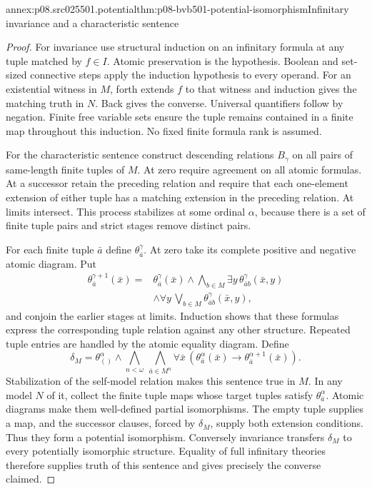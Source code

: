 \begin{annexitem}{annex:p08.src025501.potential}{thm:p08-bvb501-potential-isomorphism}{Infinitary invariance and a characteristic sentence}
\begin{proof}
For invariance use structural induction on an infinitary formula at any
tuple matched by \(f\in I\). Atomic preservation is the hypothesis.
Boolean and set-sized connective steps apply the induction hypothesis to
every operand. For an existential witness in \(M\), forth extends \(f\)
to that witness and induction gives the matching truth in \(N\). Back
gives the converse. Universal quantifiers follow by negation. Finite free
variable sets ensure the tuple remains contained in a finite map throughout
this induction. No fixed finite formula rank is assumed.

For the characteristic sentence construct descending relations \(B_\gamma\)
on all pairs of same-length finite tuples of \(M\). At zero require
agreement on all atomic formulas. At a successor retain the preceding
relation and require that each one-element extension of either tuple has
a matching extension in the preceding relation. At limits intersect.
This process stabilizes at some ordinal \(\alpha\), because there is
a set of finite tuple pairs and strict stages remove distinct pairs.

For each finite tuple \(\bar a\) define \(\theta_{\bar a}^\gamma\).
At zero take its complete positive and negative atomic diagram. Put
\[
\begin{split}
\theta_{\bar a}^{\gamma+1}(\bar x)={}&
 \theta_{\bar a}^\gamma(\bar x)
 \land\bigwedge_{b\in M}\exists y\,
       \theta_{\bar a b}^\gamma(\bar x,y)\\
 &\land\forall y\,\bigvee_{b\in M}
       \theta_{\bar a b}^\gamma(\bar x,y),
\end{split}
\]
and conjoin the earlier stages at limits. Induction shows that these
formulas express the corresponding tuple relation against any other
structure. Repeated tuple entries are handled by the atomic equality
diagram. Define
\[
\delta_M=\theta_{()}^\alpha\land
 \bigwedge_{n<\omega}\ \bigwedge_{\bar a\in M^n}
 \forall\bar x\,
 (\theta_{\bar a}^\alpha(\bar x)
       \to\theta_{\bar a}^{\alpha+1}(\bar x)).
\]
Stabilization of the self-model relation makes this sentence true in \(M\).
In any model \(N\) of it, collect the finite tuple maps whose target
tuples satisfy \(\theta_{\bar a}^\alpha\). Atomic diagrams make them
well-defined partial isomorphisms. The empty tuple supplies a map, and
the successor clauses, forced by \(\delta_M\), supply both extension
conditions. Thus they form a potential isomorphism. Conversely invariance
transfers \(\delta_M\) to every potentially isomorphic structure.
Equality of full infinitary theories therefore supplies truth of this
sentence and gives precisely the converse claimed.


\end{proof}
\end{annexitem}
